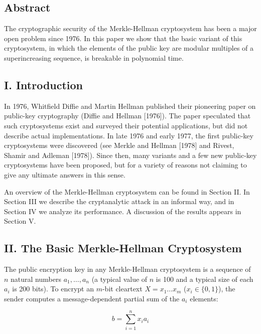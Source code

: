 \documentclass{article}
\begin{document}
\subsection*{Abstract}

The cryptographic security of the Merkle-Hellman cryptosystem has been a major open problem since 1976. In this paper we show that the basic variant of this cryptosystem, in which the elements of the public key are modular multiples of a superincreasing sequence, is breakable in polynomial time.

\subsection*{I. Introduction}

In 1976, Whitfield Diffie and Martin Hellman published their pioneering paper on public-key cryptography (Diffie and Hellman [1976]). The paper speculated that such cryptosystems exist and surveyed their potential applications, but did not describe actual implementations. In late 1976 and early 1977, the first public-key cryptosystems were discovered (see Merkle and Hellman [1978] and Rivest, Shamir and Adleman [1978]). Since then, many variants and a few new public-key cryptosystems have been proposed, but for a variety of reasons not claiming to give any ultimate answers in this sense.

An overview of the Merkle-Hellman cryptosystem can be found in Section II. In Section III we describe the cryptanalytic attack in an informal way, and in Section IV we analyze its performance. A discussion of the results appears in Section V.

\subsection*{II. The Basic Merkle-Hellman Cryptosystem}

The public encryption key in any Merkle-Hellman cryptosystem is a sequence of $n$ natural numbers $a_1, \dots, a_n$ (a typical value of $n$ is 100 and a typical size of each $a_i$ is 200 bits). To encrypt an $m$-bit cleartext $X = x_1 \dots x_m$ ($x_i \in \{0,1\}$), the sender computes a message-dependent partial sum of the $a_i$ elements:

\[ b = \sum_{i=1}^{n} x_i a_i \]
\end{document}
